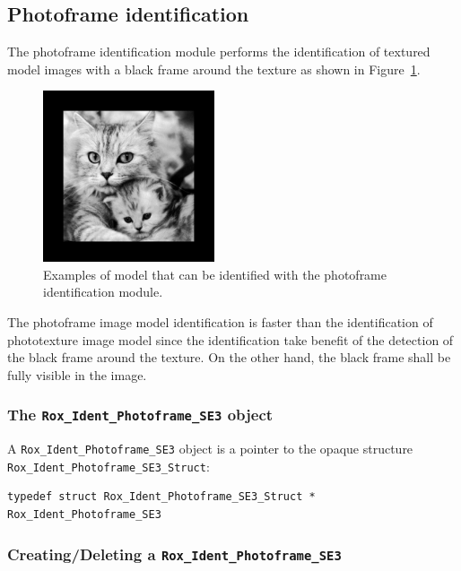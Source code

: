 \subsection{Photoframe identification}
\label{sse:ident_photoframe}

\noindent The photoframe identification module performs the identification of textured model images with a black frame around the texture as shown in Figure~\ref{fig:ident_photoframe}. 

\begin{figure}[H]
\centering
\includegraphics[width=0.45\textwidth]{vision/figures/ident_photoframe} 
\caption{Examples of model that can be identified with the photoframe identification module.}
\label{fig:ident_photoframe}
\end{figure}

The photoframe image model identification is faster than the
identification of phototexture image model since the identification
take benefit of the detection of the black frame around the texture.
On the other hand, the black frame shall be fully visible in the image.

\subsubsection{The {\tt Rox\_Ident\_Photoframe\_SE3} object}
\label{sss:ident_photoframe_object}
A \lstinline$Rox_Ident_Photoframe_SE3$ object is a pointer to the opaque structure \lstinline$Rox_Ident_Photoframe_SE3_Struct$: 

\begin{lstlisting}
typedef struct Rox_Ident_Photoframe_SE3_Struct * Rox_Ident_Photoframe_SE3
\end{lstlisting}

\subsubsection{Creating/Deleting a {\tt Rox\_Ident\_Photoframe\_SE3}}
\label{sss:ident_photoframe_newdel}
~\\

